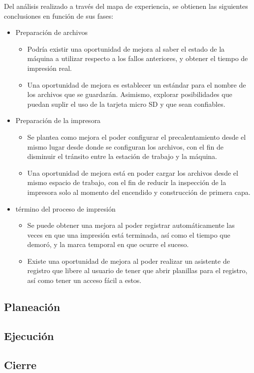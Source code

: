 Del análisis realizado a través del mapa de experiencia, se obtienen las siguientes conclusiones en función de sus fases:

\begin{itemize}
\item Preparación de archivos
\begin{itemize}
\item Podría existir una oportunidad de mejora al saber el estado de la máquina a utilizar respecto a los fallos anteriores, y obtener el tiempo de impresión real.
\item Una oportunidad de mejora es establecer un estándar para el nombre de los archivos que se guardarán. Asimismo, explorar posibilidades que puedan suplir el uso de la tarjeta micro SD y que sean confiables.
\end{itemize}
\item Preparación de la impresora
\begin{itemize}
\item Se plantea como mejora el poder configurar el precalentamiento desde el mismo lugar desde donde se configuran los archivos, con el fin de disminuir el tránsito entre la estación de trabajo y la máquina.
\item Una oportunidad de mejora está en poder cargar los archivos desde el mismo espacio de trabajo, con el fin de reducir la inspección de la impresora solo al momento del encendido y construcción de primera capa.
\end{itemize}
\item término del proceso de impresión
\begin{itemize}
\item Se puede obtener una mejora al poder registrar automáticamente las veces en que una impresión está terminada, así como el tiempo que demoró, y la marca temporal en que ocurre el suceso.
\item Existe una oportunidad de mejora al poder realizar un asistente de registro que libere al usuario de tener que abrir planillas para el registro, así como tener un acceso fácil a estos. 
\end{itemize}
\end{itemize}






\subsection{Planeación}

\subsection{Ejecución}

\subsection{Cierre}